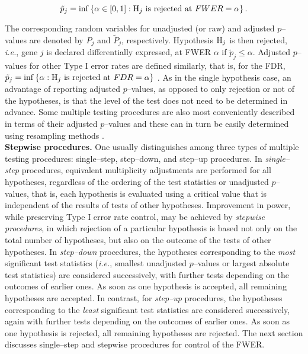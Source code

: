 \documentclass[11pt]{article}
\begin{document}
$$\tilde{p}_j = \inf\left \{\alpha \in [0,1]: \mbox{${\rm H}_j$ is rejected at $FWER = \alpha$} \right \}.$$

The corresponding random variables for unadjusted (or raw) and adjusted
$p$--values are denoted by $P_j$ and $\tilde{P}_j$, respectively. Hypothesis ${\rm H}_j$ is then rejected, {\it i.e.}, gene $j$ is
declared differentially expressed, at FWER $\alpha$ if $\tilde{p}_j
\leq \alpha$. Adjusted $p$--values for other Type I error rates are
defined similarly, that is, for the FDR,  $\tilde{p}_j = \inf\left
  \{\alpha : \mbox{${\rm H}_j$ is rejected at $FDR = \alpha$} \right
\}$ \citep{Yekutieli&Benjamini99}. As in the single hypothesis case, an
advantage of reporting adjusted $p$--values, as opposed to only
rejection or not of the hypotheses, is that the level of the test does
not need to be determined in advance. Some multiple testing procedures
are also most conveniently described in terms of their adjusted
$p$--values and these can in turn be easily determined using resampling
methods \citep{Westfall&Young93}.\\

{\bf Stepwise procedures.} One usually distinguishes among three
types of multiple testing procedures: single--step, step--down, and
step--up procedures. In {\it single--step} procedures, equivalent
multiplicity adjustments are performed for all hypotheses, regardless
of the ordering of the test statistics or unadjusted
$p$--values, that is, each hypothesis is evaluated using a critical value that is independent of the results of tests of other hypotheses. Improvement in power, while preserving Type I error rate
control, may be achieved by {\it stepwise procedures}, in which
rejection of a particular hypothesis is based not only on the total
number of hypotheses, but also on the outcome of the tests of other
hypotheses. In {\it step--down} procedures, the hypotheses corresponding to the {\it most} significant test statistics ({\it i.e.}, smallest unadjusted $p$--values or largest absolute test statistics) are considered successively, with further tests depending on the outcomes of earlier ones. As soon as one hypothesis is accepted, all remaining hypotheses are accepted. In contrast, for {\it step--up} procedures, the hypotheses corresponding to the {\it least} significant test statistics are considered successively, again with further tests depending on the outcomes of earlier ones. As soon as one hypothesis is rejected, all remaining hypotheses are rejected.  The next section discusses single--step and stepwise procedures for control of the FWER.
\end{document}
